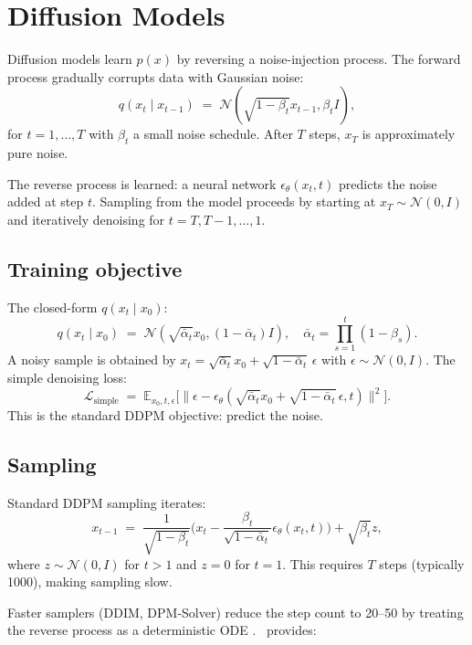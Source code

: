 \section{Diffusion Models}
\label{sec:generative:diffusion}

Diffusion models \cite{ho_ddpm_2020} learn $p(x)$ by reversing
a noise-injection process. The forward process gradually corrupts
data with Gaussian noise:
\[
  q(x_t \mid x_{t-1}) \;=\; \mathcal{N}(\sqrt{1 - \beta_t} x_{t-1}, \beta_t I),
\]
for $t = 1, \ldots, T$ with $\beta_t$ a small noise schedule.
After $T$ steps, $x_T$ is approximately pure noise.

The reverse process is learned: a neural network $\epsilon_\theta(x_t, t)$
predicts the noise added at step $t$. Sampling from the model
proceeds by starting at $x_T \sim \mathcal{N}(0, I)$ and
iteratively denoising for $t = T, T-1, \ldots, 1$.

\subsection{Training objective}
\label{ssec:generative:diffusion_loss}

The closed-form $q(x_t \mid x_0)$:
\[
  q(x_t \mid x_0) \;=\; \mathcal{N}(\sqrt{\bar{\alpha}_t} x_0, (1 - \bar{\alpha}_t) I), \quad
  \bar{\alpha}_t = \prod_{s=1}^t (1 - \beta_s).
\]
A noisy sample is obtained by
$x_t = \sqrt{\bar{\alpha}_t} x_0 + \sqrt{1 - \bar{\alpha}_t}\,\epsilon$ with
$\epsilon \sim \mathcal{N}(0, I)$. The simple denoising loss:
\[
  \mathcal{L}_{\text{simple}} \;=\;
  \mathbb{E}_{x_0, t, \epsilon}
  \bigl[
    \|\epsilon - \epsilon_\theta(\sqrt{\bar{\alpha}_t} x_0 + \sqrt{1 - \bar{\alpha}_t}\,\epsilon, t)\|^2
  \bigr].
\]
This is the standard DDPM \cite{ho_ddpm_2020} objective: predict
the noise.

\subsection{Sampling}
\label{ssec:generative:diffusion_sampling}

Standard DDPM sampling iterates:
\[
  x_{t-1} \;=\; \frac{1}{\sqrt{1 - \beta_t}}\bigl(x_t - \frac{\beta_t}{\sqrt{1 - \bar{\alpha}_t}} \epsilon_\theta(x_t, t)\bigr) + \sqrt{\beta_t} z,
\]
where $z \sim \mathcal{N}(0, I)$ for $t > 1$ and $z = 0$ for
$t = 1$. This requires $T$ steps (typically 1000), making
sampling slow.

Faster samplers (DDIM, DPM-Solver) reduce the step count to
20--50 by treating the reverse process as a deterministic ODE
\cite{song_score_sde_2021}. \Lucid\ provides:

